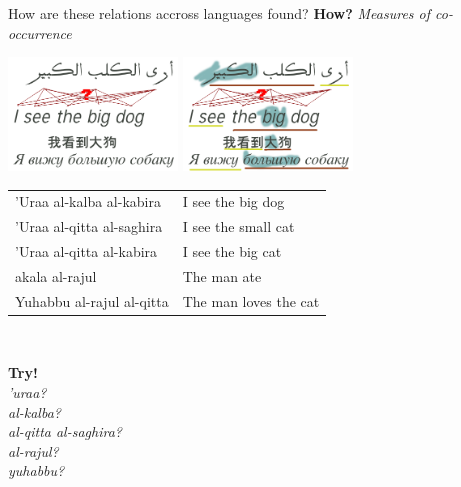\documentclass[compress]{beamer}
\begin{document}
\begin{frame}[fragile]
	\begin{block}{How are these relations accross languages found?}
		\textbf{How?} \emph{Measures of co-occurrence} \\
	\end{block}

	\begin{center}
	 \includegraphics[width=45.0mm]{align1.png} \includegraphics[width=45.0mm]{align2.png} 
	\end{center}
\end{frame}


\begin{frame}[fragile]
	\begin{example}	
		\begin{tabular}{l|l}
			'Uraa al-kalba al-kabira & I see the big dog \\
			'Uraa al-qitta al-saghira & I see the small cat	\\
			'Uraa al-qitta al-kabira & I see the big cat	\\
			akala al-rajul & The man ate \\
			Yuhabbu al-rajul al-qitta &  The man loves the cat \\
		\end{tabular} \\	

	\end{example}
	
	\smallskip
	\begin{center}
	\textbf{Try!} \\ \emph{'uraa?} \\
	\emph{al-kalba?} \\
	\emph{al-qitta al-saghira?} \\
	\emph{al-rajul?} \\
	\emph{yuhabbu?} \\
	\end{center}

\end{frame}
\end{document}
